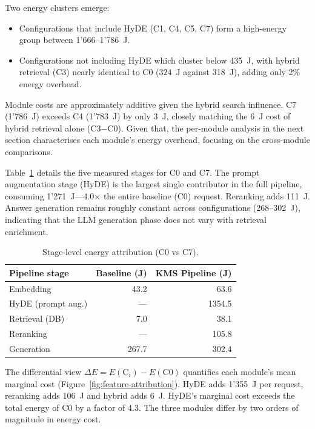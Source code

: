Two energy clusters emerge:
\begin{itemize}
    \item Configurations that include HyDE (C1, C4, C5, C7) form a high-energy group 
    between 1{'}666--1{'}786~J.
    \item Configurations not including HyDE which cluster below 435~J, with hybrid retrieval (C3)
    nearly identical to C0 (324~J against 318~J), adding only 2\% energy overhead.
\end{itemize}

Module costs are approximately additive given the hybrid search influence.
C7 (1{'}786~J) exceeds C4 (1{'}783~J) by only 3~J, closely matching the 6~J cost of hybrid retrieval
alone (C3$-$C0). Given that, the per-module analysis in the next section characterises
each module's energy overhead, focusing on the cross-module comparisons.


Table~\ref{tab:stage-energy} details the five measured stages for C0 and C7.
The prompt augmentation stage (HyDE) is the largest single contributor in the
full pipeline, consuming 1{'}271~J---4.0$\times$ the entire baseline (C0)
request. Reranking adds 111~J. Answer generation remains roughly constant
across configurations (268--302~J), indicating that the LLM generation phase
does not vary with retrieval enrichment.

\begin{table}[h!]
\centering
\begin{tabular}{l r r}
\hline
\textbf{Pipeline stage} & \textbf{Baseline (J)} & \textbf{KMS Pipeline (J)} \\
\hline
Embedding           &  43.2 &   63.6 \\
HyDE (prompt aug.)  &   --- & 1354.5 \\
Retrieval (DB)      &   7.0 &   38.1 \\
Reranking           &   --- &  105.8 \\
Generation          & 267.7 &  302.4 \\
\hline
\end{tabular}
\caption{Stage-level energy attribution (C0 vs C7).}
\label{tab:stage-energy}
\end{table}


The differential view $\Delta E = E(\text{C}_i) - E(\text{C0})$ quantifies
each module's mean marginal cost (Figure~\ref{fig:feature-attribution}). HyDE adds
1{'}355~J per request, reranking adds 106~J and hybrid adds 6~J. HyDE's
marginal cost exceeds the total energy of C0 by a factor of 4.3. The three
modules differ by two orders of magnitude in energy cost.

